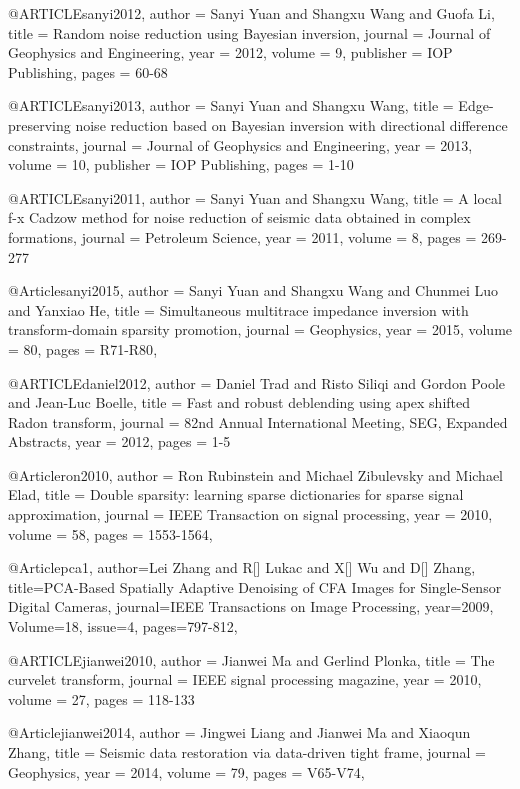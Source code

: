 {@ARTICLE{sanyi2012,
  author = {Sanyi Yuan and Shangxu Wang and Guofa Li},
  title = {Random noise reduction using Bayesian inversion},
  journal = {Journal of Geophysics and Engineering},
  year = {2012},
  volume = {9},
  publisher = {IOP Publishing},
  pages = {60-68}
}

@ARTICLE{sanyi2013,
  author = {Sanyi Yuan and Shangxu Wang},
  title = {Edge-preserving noise reduction based on Bayesian inversion with directional difference constraints},
  journal = {Journal of Geophysics and Engineering},
  year = {2013},
  volume = {10},
  publisher = {IOP Publishing},
  pages = {1-10}
}

@ARTICLE{sanyi2011,
  author = {Sanyi Yuan and Shangxu Wang},
  title = {A local f-x Cadzow method for noise reduction of seismic data obtained in complex formations},
  journal = {Petroleum Science},
  year = {2011},
  volume = {8},
  pages = {269-277}
}

@Article{sanyi2015,
  author = 	 {Sanyi Yuan and Shangxu Wang and Chunmei Luo and Yanxiao He},
  title = 	 {Simultaneous multitrace impedance inversion with transform-domain sparsity promotion},
  journal = 	 {Geophysics},
  year = 	 2015,
  volume =	 80,
  pages =	 {R71-R80},
}

@ARTICLE{daniel2012,
  author = {Daniel Trad and Risto Siliqi and Gordon Poole and Jean-Luc Boelle},
  title = {Fast and robust deblending using apex shifted Radon transform},
  journal = {82nd Annual International Meeting, SEG, Expanded Abstracts},
  year = {2012},
  pages = {1-5}
}

@Article{ron2010,
  author = 	 {Ron Rubinstein and Michael Zibulevsky and Michael Elad},
  title = 	 {Double sparsity: learning sparse dictionaries for sparse signal approximation},
  journal = 	 {IEEE Transaction on signal processing},
  year = 	 2010,
  volume =	 58,
  pages =	 {1553-1564},
}

@Article{pca1,
  author={Lei Zhang and R[] Lukac and X[] Wu and D[] Zhang},
  title={PCA-Based Spatially Adaptive Denoising of {CFA} Images for Single-Sensor Digital Cameras},
  journal={IEEE Transactions on Image Processing},
  year=2009,
  Volume=18,
  issue=4,
  pages={797-812},
}

@ARTICLE{jianwei2010,
  author = {Jianwei Ma and Gerlind Plonka},
  title = {The curvelet transform},
  journal = {IEEE signal processing magazine},
  year = {2010},
  volume = {27},
  pages = {118-133}
}

@Article{jianwei2014,
  author = 	 {Jingwei Liang and Jianwei Ma and Xiaoqun Zhang},
  title = 	 {Seismic data restoration via data-driven tight frame},
  journal = 	 {Geophysics},
  year = 	 2014,
  volume =	 79,
  pages =	 {V65-V74},
}

}
